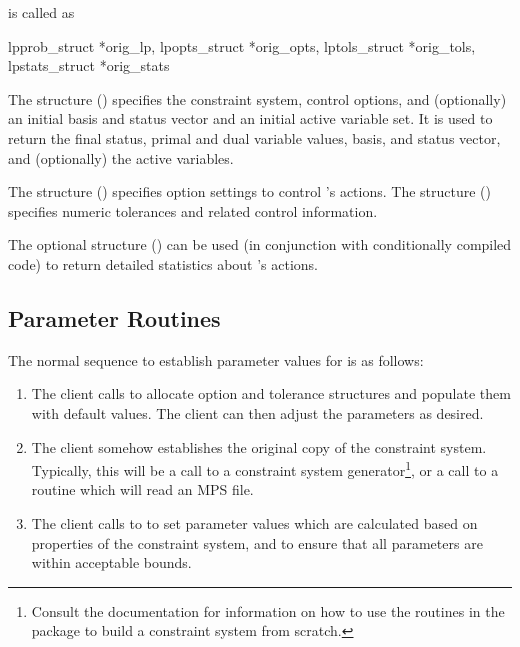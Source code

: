 \dylp is called as

\begin{subrdoc}
\item
{}
	{lpprob_struct *orig_lp, lpopts_struct *orig_opts,
         lptols_struct *orig_tols, \\ lpstats_struct *orig_stats}

The  structure () specifies the constraint
system, control options, and (optionally) an initial basis and status vector
and an initial active variable set.
It is used to return the final status, primal and dual variable values,
basis, and status vector, and (optionally) the active variables.

The  structure () specifies option
settings to control \dylp's actions.
The  structure () specifies
numeric tolerances and related control information.

The optional structure  () can
be used (in conjunction with
conditionally compiled code) to return detailed statistics about \dylp's
actions.
\end{subrdoc}

\subsection{Parameter Routines}
\label{sec:ParameterRoutines}

The normal sequence to establish parameter values for \dylp is as follows:
\begin{enumerate}
  \item
  The client calls  to allocate option and tolerance
  structures and populate them with default values.
  The client can then adjust the parameters as desired.

  \item
  The client somehow establishes the original copy of the constraint system.
  Typically, this will be a call to a constraint system generator\footnote{%
  Consult the  documentation for information on how to use
  the routines in the  package to build a constraint system
  from scratch.}, or a call
  to a routine which will read an MPS file.

  \item
  The client calls  to
  to set parameter values which are calculated based on
  properties of the constraint system, and to ensure that all parameters
  are within acceptable bounds.
\end{enumerate}


